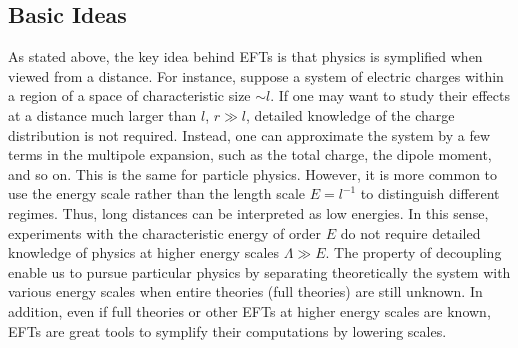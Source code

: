 \subsection{Basic Ideas}
As stated above, the key idea behind EFTs is that physics is symplified when viewed from a distance. For instance, suppose a system of electric charges within a region of a space of characteristic size $\sim l$. If one may want to study their effects at a distance much larger than $l$, $r \gg l$, detailed knowledge of the charge distribution is not required. Instead, one can approximate the system by a few terms in the multipole expansion, such as the total charge, the dipole moment, and so on. This is the same for particle physics. However, it is more common to use the energy scale rather than the length scale $E = l^{-1}$ to distinguish different regimes. Thus, long distances can be interpreted as low energies. In this sense, experiments with the characteristic energy of order $E$ do not require detailed knowledge of physics at higher energy scales $\Lambda \gg E$. The property of decoupling enable us to pursue particular physics by separating theoretically the system with various energy scales when entire theories (full theories) are still unknown. In addition, even if full theories or other EFTs at higher energy scales are known, EFTs are great tools to symplify their computations by lowering scales.  



